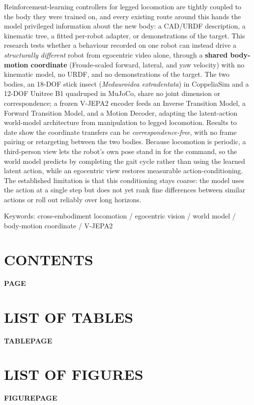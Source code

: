 \documentclass[12pt,a4paper,oneside]{report}
\makeatletter
\renewcommand{\@dotsep}{10000}
\renewcommand{\listtablename}{LIST OF TABLES}
\renewcommand{\listfigurename}{LIST OF FIGURES}
\renewcommand\listoftables{%
  \chapter*{\listtablename}%
  \noindent\textbf{TABLE}\hfill\textbf{PAGE}\par\nobreak\vspace{2pt}%
  \@starttoc{lot}%
}
\renewcommand\listoffigures{%
  \chapter*{\listfigurename}%
  \noindent\textbf{FIGURE}\hfill\textbf{PAGE}\par\nobreak\vspace{2pt}%
  \@starttoc{lof}%
}
\renewcommand{\contentsname}{CONTENTS}
\renewcommand\tableofcontents{%
  \chapter*{\contentsname}%
  \noindent\hfill\textbf{PAGE}\par\nobreak\vspace{2pt}%
  \@starttoc{toc}%
}
\makeatother
\begin{document}
\noindent Reinforcement-learning controllers for legged locomotion are tightly coupled to the body they were
trained on, and every existing route around this hands the model privileged information about the new body: a
CAD/URDF description, a kinematic tree, a fitted per-robot adapter, or demonstrations of the target. This research
tests whether a behaviour recorded on one robot can instead drive a \emph{structurally different} robot from
egocentric video alone, through a \textbf{shared body-motion coordinate} (Froude-scaled forward, lateral, and yaw
velocity) with no kinematic model, no URDF, and no demonstrations of the target. The two bodies, an 18-DOF stick
insect (\emph{Medauroidea extradentata}) in CoppeliaSim and a 12-DOF Unitree B1 quadruped in MuJoCo, share no
joint dimension or correspondence; a frozen V-JEPA2 encoder feeds an Inverse Transition Model, a Forward
Transition Model, and a Motion Decoder, adapting the latent-action world-model architecture from manipulation to
legged locomotion. Results to date show the coordinate transfers can be \emph{correspondence-free}, with no frame
pairing or retargeting between the two bodies. Because locomotion is periodic, a third-person view lets the
robot's own pose stand in for the command, so the world model predicts by completing the gait cycle rather than
using the learned latent action, while an egocentric view restores measurable action-conditioning. The established
limitation is that this conditioning stays coarse: the model uses the action at a single step but does not yet
rank fine differences between similar actions or roll out reliably over long horizons.

\vspace{4mm}
\noindent Keywords: cross-embodiment locomotion / egocentric vision / world model / body-motion coordinate / V-JEPA2


\begingroup
\makeatletter
\renewcommand{\@dotsep}{2}%
\makeatother
\setlength{\parskip}{2pt}%
\linespread{1.0}\selectfont
\tableofcontents
\endgroup
\thispagestyle{fancy}
\begingroup
\makeatletter
\renewcommand{\addvspace}[1]{}%
\renewcommand{\@dotsep}{2}%
\makeatother
\listoftables
\thispagestyle{fancy}
\listoffigures
\thispagestyle{fancy}
\endgroup
\end{document}

